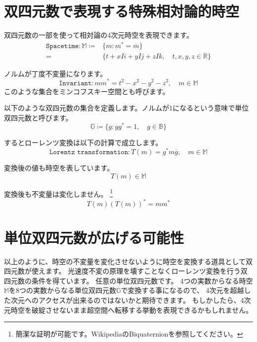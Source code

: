 \documentclass[a4paper,12pt,notitlepage]{jsreport}
\begin{document}
\section{双四元数で表現する特殊相対論的時空}

双四元数の一部を使って相対論の4次元時空を表現できます。
\begin{equation}
  \begin{split}
    \texttt{Spacetime}:\mathbb{M}\coloneq &\{m:m^*=\overline{m}\}\\
    =&\{t+xIi+yIj+zIk,\quad t,x,y,z\in\mathbb{R}\}
  \end{split}
\end{equation}

ノルムが丁度不変量になります。
\begin{equation}
  \texttt{Invariant}:mm^*=t^2-x^2-y^2-z^2,\quad m\in\mathbb{M}
\end{equation}
このような集合をミンコフスキー空間とも呼びます。

以下のような双四元数の集合を定義します。ノルムが1になるという意味で単位双四元数と呼びます。
\begin{equation}
  \mathbb{G}\coloneq\{g:gg^*=1,\quad g\in\mathbb{B}\}
\end{equation}

するとローレンツ変換は以下の計算で成立します。
\begin{equation}
  \texttt{Lorentz transformation}:T(m)=g^*m\overline{g},\quad m\in\mathbb{M}
\end{equation}

変換後の値も時空を表しています。
\begin{equation}
  T(m)\in\mathbb{M}
\end{equation}

変換後も不変量は変化しません。
\footnote{簡潔な証明が可能です。WikipediaのBiquaternionを参照してください。}
\begin{equation}
  T(m)(T(m))^*=mm^*
\end{equation}

\section{単位双四元数が広げる可能性}

以上のように、時空の不変量を変化させないように時空を変換する道具として双四元数が使えます。
光速度不変の原理を壊すことなくローレンツ変換を行う双四元数の条件を得ています。
任意の単位双四元数です。
4つの実数からなる時空$\mathbb{M}$を8つの実数からなる単位双四元数$\mathbb{G}$で変換する事になるので、
4次元を超越した次元へのアクセスが出来るのではないかと期待できます。
もしかしたら、4次元時空を破綻させないまま超空間へ転移する挙動を表現できるかもしれません。
\end{document}
